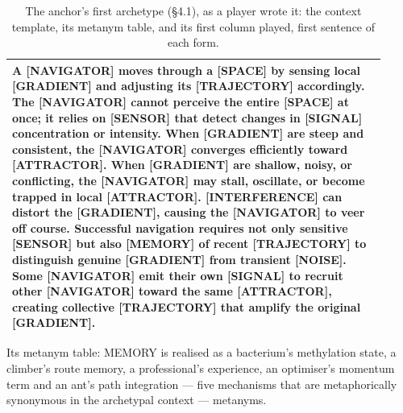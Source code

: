 \documentclass{article}
\begin{document}
\begin{table}[htb]
\caption{The anchor's first archetype (\S{}4.1), as a player wrote it: the context template, its metanym table, and its first column played, first sentence of each form.}
\label{tab-anchor-metanym}
\begin{center}\footnotesize
\begin{tabular}{>{\raggedright\arraybackslash}p{0.92\linewidth}}
\toprule\noalign{}
A {[}NAVIGATOR{]} moves through a {[}SPACE{]} by sensing local {[}GRADIENT{]} and adjusting its {[}TRAJECTORY{]} accordingly. The {[}NAVIGATOR{]} cannot perceive the entire {[}SPACE{]} at once; it relies on {[}SENSOR{]} that detect changes in {[}SIGNAL{]} concentration or intensity. When {[}GRADIENT{]} are steep and consistent, the {[}NAVIGATOR{]} converges efficiently toward {[}ATTRACTOR{]}. When {[}GRADIENT{]} are shallow, noisy, or conflicting, the {[}NAVIGATOR{]} may stall, oscillate, or become trapped in local {[}ATTRACTOR{]}. {[}INTERFERENCE{]} can distort the {[}GRADIENT{]}, causing the {[}NAVIGATOR{]} to veer off course. Successful navigation requires not only sensitive {[}SENSOR{]} but also {[}MEMORY{]} of recent {[}TRAJECTORY{]} to distinguish genuine {[}GRADIENT{]} from transient {[}NOISE{]}. Some {[}NAVIGATOR{]} emit their own {[}SIGNAL{]} to recruit other {[}NAVIGATOR{]} toward the same {[}ATTRACTOR{]}, creating collective {[}TRAJECTORY{]} that amplify the original {[}GRADIENT{]}. \\
\bottomrule
\end{tabular}
\end{center}
\vspace{4pt}\begin{flushleft}\small Its metanym table: MEMORY is realised as a bacterium's methylation state, a climber's route memory, a professional's experience, an optimiser's momentum term and an ant's path integration --- five mechanisms that are metaphorically synonymous in the archetypal context --- metanyms.\end{flushleft}
\begin{center}\small
{}
\end{center}
\end{table}
\end{document}
